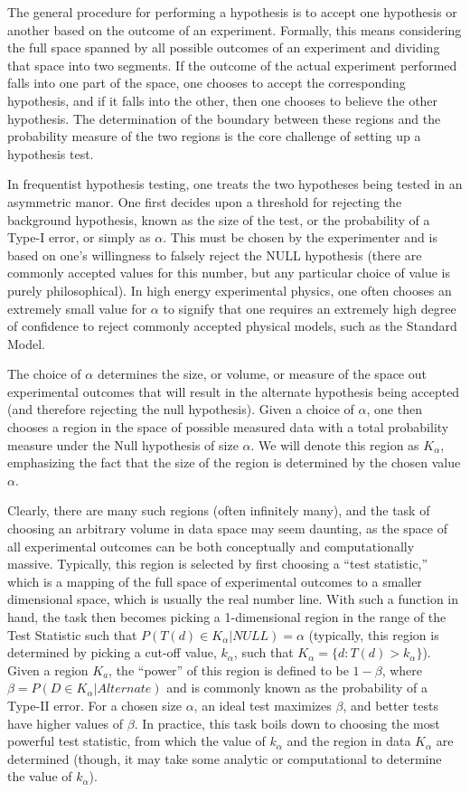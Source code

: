 The general procedure for performing a hypothesis is to accept one hypothesis or another based on the outcome of an experiment.
Formally, this means considering the full space spanned by all possible outcomes of an experiment and dividing that space into two segments.
If the outcome of the actual experiment performed falls into one part of the space, one chooses to accept the corresponding hypothesis, and if it falls into the other, then one chooses to believe the other hypothesis.
The determination of the boundary between these regions and the probability measure of the two regions is the core challenge of setting up a hypothesis test.

In frequentist hypothesis testing, one treats the two hypotheses being tested in an asymmetric manor.
One first decides upon a threshold for rejecting the background hypothesis, known as the size of the test, or the probability of a Type-I error, or simply as $\alpha$.
This must be chosen by the experimenter and is based on one's willingness to falsely reject the NULL hypothesis (there are commonly accepted values for this number, but any particular choice of value is purely philosophical).
In high energy experimental physics, one often chooses an extremely small value for $\alpha$ to signify that one requires an extremely high degree of confidence to reject commonly accepted physical models, such as the Standard Model.

The choice of $\alpha$ determines the size, or volume, or measure of the space out experimental outcomes that will result in the alternate hypothesis being accepted (and therefore rejecting the null hypothesis).
Given a choice of $\alpha$, one then chooses a region in the space of possible measured data with a total probability measure under the Null hypothesis of size $\alpha$.
We will denote this region as $K_{\alpha}$, emphasizing the fact that the size of the region is determined by the chosen value $\alpha$.

Clearly, there are many such regions (often infinitely many), and the task of choosing an arbitrary volume in data space may seem daunting, as the space of all experimental outcomes can be both conceptually and computationally massive.
Typically, this region is selected by first choosing a ``test statistic,'' which is a mapping of the full space of experimental outcomes to a smaller dimensional space, which is usually the real number line.
With such a function in hand, the task then becomes picking a 1-dimensional region in the range of the Test Statistic such that $P( T(d) \in K_{ \alpha } | NULL) = \alpha$ (typically, this region is determined by picking a cut-off value, $k_{\alpha}$, such that $K_{\alpha} = \{d : T(d) > k_{\alpha} \}$).
Given a region $K_{a}$, the ``power'' of this region is defined to be $1 - \beta$, where $\beta = P(D \in K_{ \alpha } | Alternate)$ and is commonly known as the probability of a Type-II error.
For a chosen size $\alpha$, an ideal test maximizes $\beta$, and better tests have higher values of $\beta$.
In practice, this task boils down to choosing the most powerful test statistic, from which the value of $k_{\alpha}$ and the region in data $K_{\alpha}$ are determined (though, it may take some analytic or computational to determine the value of $k_{\alpha}$).


